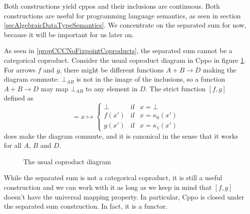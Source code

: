 \documentclass[a4paper]{article}
\newcommand{\arr}{\rightarrow}
\begin{document}
Both constructions yield cppos and their inclusions are continuous.  Both
constructions are useful for programming language semantics, as seen in section
\ref{secAlgebraicDataTypeSemantics}.  We concentrate on the separated sum for
now, because it will be important for us later on.

As seen in \ref{propCCCNoFixpointCoproducts}, the separated sum cannot be a
categorical coproduct. Consider the usual coproduct diagram in Cppo in
figure \ref{figCoproductDiagram}. For arrows $f$ and $g$,
there might be different functions $A+B \arr D$ making the diagram commute:
$\bot_{AB}$ is not in the image of the inclusions, so a function $A+B \arr D$
may map $\bot_{AB}$ to any element in $D$.  The strict function $[f\!,g]$
defined as
\begin{equation*}
[f\!,g] = x \mapsto \left\{
  \begin{array}{lcl}
   \bot   & \text{if} & x = \bot \\
   f(x')  & \text{if} & x = \kappa_0(x') \\
   g(x')  & \text{if} & x = \kappa_1(x')
  \end{array}
\right.
\end{equation*}
does make the diagram commute, and it is canonical in the sense that it
works for all $A$, $B$ and $D$.

\begin{figure}[ht]
\begin{center}
\end{center}
\caption{The usual coproduct diagram} \label{figCoproductDiagram}
\end{figure}

While the separated sum is not a categorical coproduct, it is still a
useful construction and we can work with it as long as we keep in mind that
$[f\!,g]$ doesn't have the universal mapping property. In particular, Cppo is
closed under the separated sum construction. In fact, it is a functor.
\end{document}
